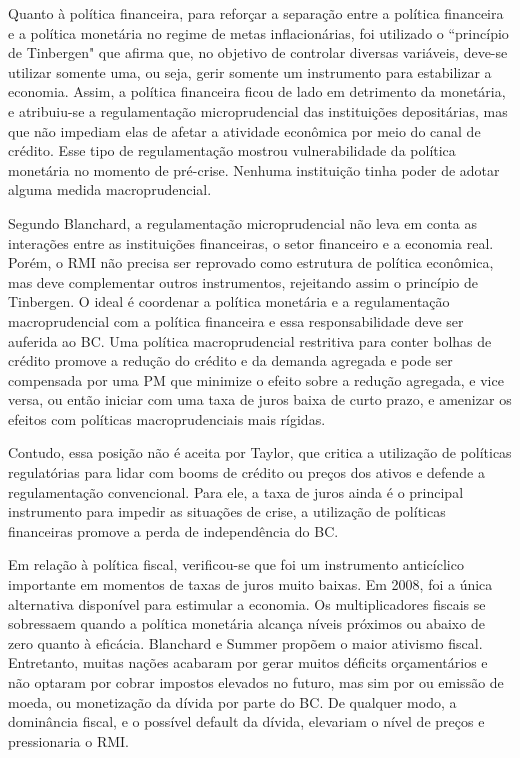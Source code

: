\documentclass[report]{uftex}
\begin{document}
Quanto à política financeira, para reforçar a separação entre a política financeira e a política monetária no regime de metas inflacionárias, foi utilizado o ``princípio de Tinbergen" que afirma que, no objetivo de controlar diversas variáveis, deve-se utilizar somente uma, ou seja, gerir somente um instrumento para estabilizar a economia. Assim, a política financeira ficou de lado em detrimento da monetária, e atribuiu-se a regulamentação microprudencial das instituições depositárias, mas que não impediam elas de afetar a atividade econômica por meio do canal de crédito. Esse tipo de regulamentação mostrou vulnerabilidade da política monetária no momento de pré-crise. Nenhuma instituição tinha poder de adotar alguma medida macroprudencial. 

Segundo Blanchard, a regulamentação microprudencial não leva em conta as interações entre as instituições financeiras, o setor financeiro e a economia real. Porém, o RMI não precisa ser reprovado como estrutura de política econômica, mas deve complementar outros instrumentos, rejeitando assim o princípio de Tinbergen. O ideal é coordenar a política monetária e a regulamentação macroprudencial com a política financeira e essa responsabilidade deve ser auferida ao BC. Uma política macroprudencial restritiva para conter bolhas de crédito promove a redução do crédito e da demanda agregada e pode ser compensada por uma PM que minimize o efeito sobre a redução agregada, e vice versa, ou então iniciar com uma taxa de juros baixa de curto prazo, e amenizar os efeitos com políticas macroprudenciais mais rígidas.

Contudo, essa posição não é aceita por Taylor, que critica a utilização de políticas regulatórias para lidar com booms de crédito ou preços dos ativos e defende a regulamentação convencional. Para ele, a taxa de juros ainda é o principal instrumento para impedir as situações de crise, a utilização de políticas financeiras promove a perda de independência do BC.

Em relação à política fiscal, verificou-se que foi um instrumento anticíclico importante em momentos de taxas de juros muito baixas. Em 2008, foi a única alternativa disponível para estimular a economia. Os multiplicadores fiscais se sobressaem quando a política monetária alcança níveis próximos ou abaixo de zero quanto à eficácia. Blanchard e Summer propõem o maior ativismo fiscal. Entretanto, muitas nações acabaram por gerar muitos déficits orçamentários e não optaram por cobrar impostos elevados no futuro, mas sim por ou emissão de moeda, ou monetização da dívida por parte do BC. De qualquer modo, a dominância fiscal, e o possível default da dívida, elevariam o nível de preços e pressionaria o RMI.
\end{document}
